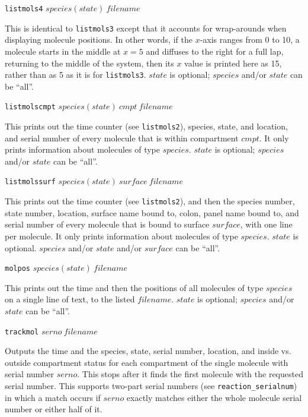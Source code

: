 \documentclass {scrbook}
\newcommand {\ttt} {\texttt}
\begin{document}
\begin{description}
\item{\ttt{listmols4} $species(state)\ filename$}

This is identical to \ttt{listmols3} except that it accounts for wrap-arounds when displaying molecule positions. In other words, if the $x$-axis ranges from 0 to 10, a molecule starts in the middle at $x = 5$ and diffuses to the right for a full lap, returning to the middle of the system, then its $x$ value is printed here as 15, rather than as 5 as it is for \ttt{listmols3}. $state$ is optional; $species$ and/or $state$ can be ``all''.

\item{\ttt{listmolscmpt} $species(state)\ cmpt\ filename$}

This prints out the time counter (see \ttt{listmols2}), species, state, and location, and serial number of every molecule that is within compartment $cmpt$. It only prints information about molecules of type $species$. $state$ is optional; $species$ and/or $state$ can be ``all''.

\item{\ttt{listmolssurf} $species(state)\ surface\ filename$}

This prints out the time counter (see \ttt{listmols2}), and then the species number, state number, location, surface name bound to, colon, panel name bound to, and serial number of every molecule that is bound to surface $surface$, with one line per molecule. It only prints information about molecules of type $species$. $state$ is optional. $species$ and/or $state$ and/or $surface$ can be ``all''.

\item{\ttt{molpos} $species(state)\ filename$}

This prints out the time and then the positions of all molecules of type $species$ on a single line of text, to the listed $filename$. $state$ is optional; $species$ and/or $state$ can be ``all''.

\item{\ttt{trackmol} $serno\ filename$}

Outputs the time and the species, state, serial number, location, and inside vs. outside compartment status for each compartment of the single molecule with serial number $serno$. This stops after it finds the first molecule with the requested serial number. This supports two-part serial numbers (see \ttt{reaction\_serialnum}) in which a match occurs if $serno$ exactly matches either the whole molecule serial number or either half of it.


\end{description}
\end{document}

